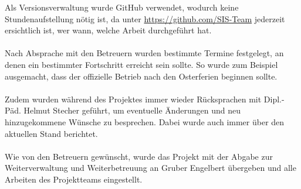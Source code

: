 Als Versionsverwaltung wurde GitHub verwendet, wodurch keine Stundenaufstellung nötig ist, da unter  \href{https://github.com/SIS-Team}{https://github.com/SIS-Team} jederzeit ersichtlich ist, wer wann, welche Arbeit durchgeführt hat.\\\\
Nach Absprache mit den Betreuern wurden bestimmte Termine festgelegt, an denen ein bestimmter Fortschritt erreicht sein sollte. So wurde zum Beispiel ausgemacht, dass der offizielle Betrieb nach den Osterferien beginnen sollte.\\\\
Zudem wurden während  des Projektes immer wieder Rücksprachen mit Dipl.-Päd. Helmut Stecher geführt, um eventuelle Änderungen und neu hinzugekommene Wünsche zu besprechen. Dabei wurde auch immer über den aktuellen Stand berichtet.\\\\
Wie von den Betreuern gewünscht, wurde das Projekt mit der Abgabe zur Weiterverwaltung und Weiterbetreuung an Gruber Engelbert übergeben und alle Arbeiten des Projektteams eingestellt.